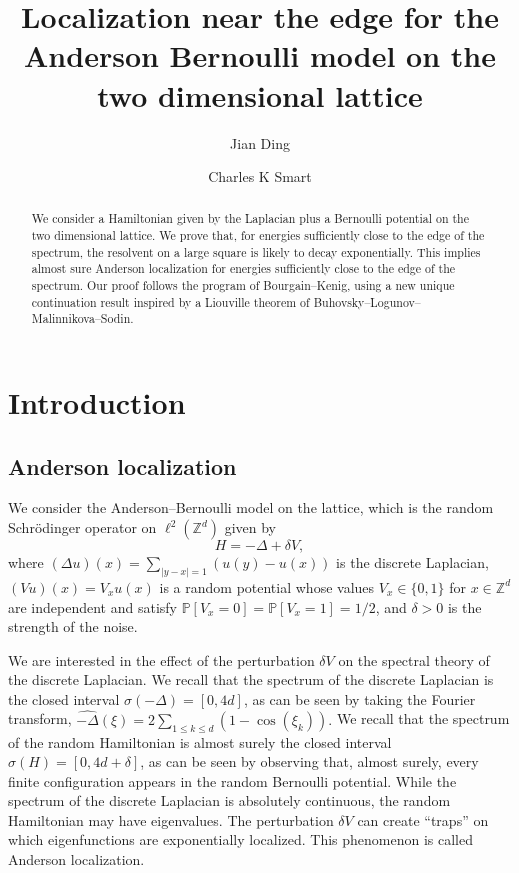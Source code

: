 \documentclass{amsart}
\numberwithin{equation}{section}
\numberwithin{figure}{section}
\newcommand{\Z}{\mathbb{Z}}
\renewcommand{\P}{\mathbb{P}}
\begin{document}
\title[Anderson localization]{Localization near the edge for the Anderson Bernoulli model on the two dimensional lattice}

\author{Jian Ding}
\address{University of Pennsylvania}

\author{Charles K Smart}
\address{University of Chicago}

\begin{abstract}
We consider a Hamiltonian given by the Laplacian plus a Bernoulli potential on the two dimensional lattice.  We prove that, for energies sufficiently close to the edge of the spectrum, the resolvent on a large square is likely to decay exponentially.  This implies almost sure Anderson localization for energies sufficiently close to the edge of the spectrum.  Our proof follows the program of Bourgain--Kenig, using a new unique continuation result inspired by a Liouville theorem of Buhovsky--Logunov--Malinnikova--Sodin.
\end{abstract}

\maketitle

\section{Introduction}

\subsection{Anderson localization}

We consider the Anderson--Bernoulli model on the lattice, which is the random Schr\"odinger operator on $\ell^2(\Z^d)$ given by
\begin{equation*}
H = - \Delta + \delta V,
\end{equation*}
where $(\Delta u)(x) = \sum_{|y-x| = 1} (u(y) - u(x))$ is the discrete Laplacian, $(V u)(x) = V_x u(x)$ is a random potential whose values $V_x \in \{ 0, 1 \}$ for $x \in \Z^d$ are independent and satisfy $\P[V_x = 0] = \P[V_x = 1] = 1/2$, and $\delta > 0$ is the strength of the noise.

We are interested in the effect of the perturbation $\delta V$ on the spectral theory of the discrete Laplacian.  We recall that the spectrum of the discrete Laplacian is the closed interval $\sigma(-\Delta) = [0,4d]$, as can be seen by taking the Fourier transform, $\widehat{-\Delta}(\xi) = 2 \sum_{1 \leq k \leq d} (1-\cos(\xi_k)).$  We recall that the spectrum of the random Hamiltonian is almost surely the closed interval $\sigma(H) = [0,4d+\delta]$, as can be seen by observing that, almost surely, every finite configuration appears in the random Bernoulli potential.  While the spectrum of the discrete Laplacian is absolutely continuous, the random Hamiltonian may have eigenvalues.  The perturbation $\delta V$ can create ``traps'' on which eigenfunctions are exponentially localized.  This phenomenon is called Anderson localization.
\end{document}
